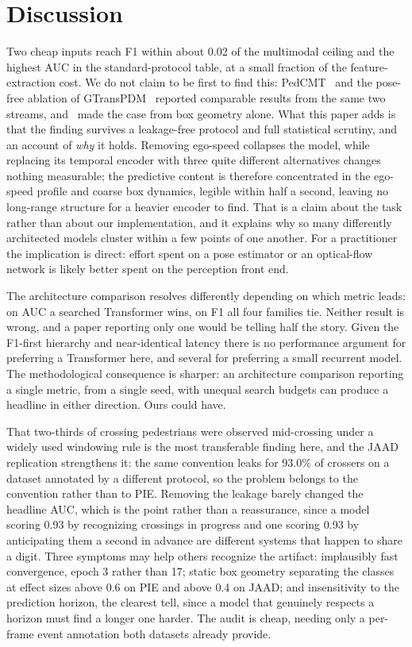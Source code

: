 \documentclass[mti,article,submit,moreauthors]{Definitions/mdpi}
\begin{document}
\section{Discussion}
\label{sec:discussion}

Two cheap inputs reach F1 within about 0.02 of the multimodal ceiling and the highest AUC in the standard-protocol table, at a small fraction of the feature-extraction cost. We do not claim to be first to find this: PedCMT~\citep{chen2024pedcmt} and the pose-free ablation of GTransPDM~\citep{xie2025gtranspdm} reported comparable results from the same two streams, and~\citet{achaji2022attention} made the case from box geometry alone. What this paper adds is that the finding survives a leakage-free protocol and full statistical scrutiny, and an account of \emph{why} it holds. Removing ego-speed collapses the model, while replacing its temporal encoder with three quite different alternatives changes nothing measurable; the predictive content is therefore concentrated in the ego-speed profile and coarse box dynamics, legible within half a second, leaving no long-range structure for a heavier encoder to find. That is a claim about the task rather than about our implementation, and it explains why so many differently architected models cluster within a few points of one another. For a practitioner the implication is direct: effort spent on a pose estimator or an optical-flow network is likely better spent on the perception front end.

The architecture comparison resolves differently depending on which metric leads: on AUC a searched Transformer wins, on F1 all four families tie. Neither result is wrong, and a paper reporting only one would be telling half the story. Given the F1-first hierarchy and near-identical latency there is no performance argument for preferring a Transformer here, and several for preferring a small recurrent model. The methodological consequence is sharper: an architecture comparison reporting a single metric, from a single seed, with unequal search budgets can produce a headline in either direction. Ours could have.

That two-thirds of crossing pedestrians were observed mid-crossing under a widely used windowing rule is the most transferable finding here, and the JAAD replication strengthens it: the same convention leaks for 93.0\% of crossers on a dataset annotated by a different protocol, so the problem belongs to the convention rather than to PIE. Removing the leakage barely changed the headline AUC, which is the point rather than a reassurance, since a model scoring 0.93 by recognizing crossings in progress and one scoring 0.93 by anticipating them a second in advance are different systems that happen to share a digit. Three symptoms may help others recognize the artifact: implausibly fast convergence, epoch 3 rather than 17; static box geometry separating the classes at effect sizes above 0.6 on PIE and above 0.4 on JAAD; and insensitivity to the prediction horizon, the clearest tell, since a model that genuinely respects a horizon must find a longer one harder. The audit is cheap, needing only a per-frame event annotation both datasets already provide.
\end{document}
